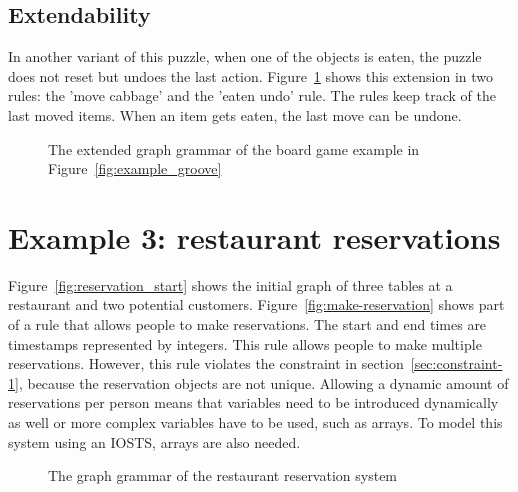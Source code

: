 \subsection{Extendability}
In another variant of this puzzle, when one of the objects is eaten, the puzzle does not reset but undoes the last action. Figure~\ref{fig:gg-fwgc-extended} shows this extension in two rules: the 'move cabbage' and the 'eaten undo' rule. The rules keep track of the last moved items. When an item gets eaten, the last move can be undone.

\begin{figure}[ht]
  \begin{center}
    \hspace{20px}
  \end{center}
  \caption{The extended graph grammar of the board game example in Figure~\ref{fig:example_groove}}
  \label{fig:gg-fwgc-extended}
\end{figure}

\section{Example 3: restaurant reservations}
Figure~\ref{fig:reservation_start} shows the initial graph of three tables at a restaurant and two potential customers. Figure~\ref{fig:make-reservation} shows part of a rule that allows people to make reservations. The start and end times are timestamps represented by integers. This rule allows people to make multiple reservations. However, this rule violates the constraint in section~\ref{sec:constraint-1}, because the reservation objects are not unique. Allowing a dynamic amount of reservations per person means that variables need to be introduced dynamically as well or more complex variables have to be used, such as arrays. To model this system using an IOSTS, arrays are also needed.

\begin{figure}[ht]
  \begin{center}
    \hspace{20px}
  \end{center}
  \caption{The graph grammar of the restaurant reservation system}
  \label{fig:gg-reservation}
\end{figure}


